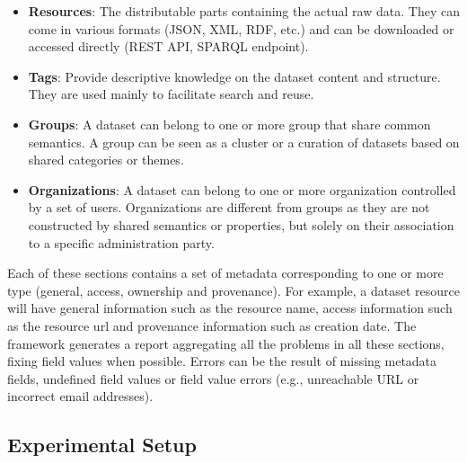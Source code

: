\begin{itemize}
  \item \textbf{Resources}: The distributable parts containing the actual raw data. They can come in various formats (JSON, XML, RDF, etc.) and can be downloaded or accessed directly (REST API, SPARQL endpoint).
  \item \textbf{Tags}: Provide descriptive knowledge on the dataset content and structure. They are used mainly to facilitate search and reuse.
  \item \textbf{Groups}: A dataset can belong to one or more group that share common semantics. A group can be seen as a cluster or a curation of datasets based on shared categories or themes.
  \item \textbf{Organizations}: A dataset can belong to one or more organization controlled by a set of users. Organizations are different from groups as they are not constructed by shared semantics or properties, but solely on their association to a specific administration party.
\end{itemize}

Each of these sections contains a set of metadata corresponding to one or more type (general, access, ownership and provenance). For example, a dataset resource will have general information such as the resource name, access information such as the resource url and provenance information such as creation date. The framework generates a report aggregating all the problems in all these sections, fixing field values when possible. Errors can be the result of missing metadata fields, undefined field values or field value errors (e.g., unreachable URL or incorrect email addresses).

\subsection{Experimental Setup}

